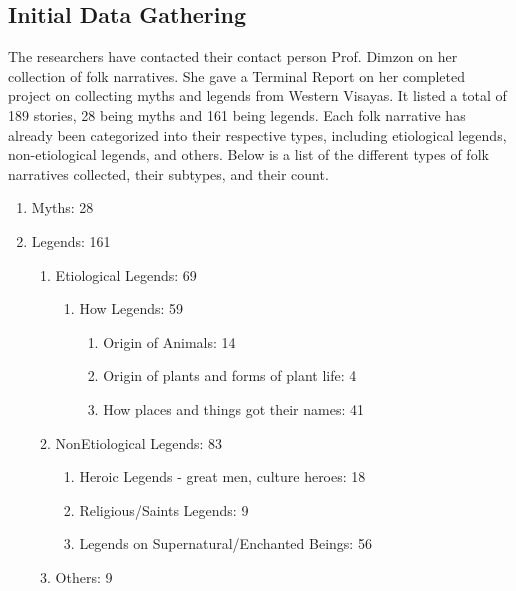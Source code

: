 \subsection{Initial Data Gathering}

The researchers have contacted their contact person Prof. Dimzon on her collection of folk narratives. She gave a Terminal Report  on her completed project on collecting myths and legends from Western Visayas. It listed a total of 189 stories, 28 being myths and 161 being legends. Each folk narrative has already been categorized into their respective types, including etiological legends, non-etiological legends, and others. Below is a list of the different types of folk narratives collected, their subtypes, and their count.

\begin{enumerate}[label=\Roman*.]
\item Myths: 28
    \item Legends: 161
    \begin{enumerate} [label=\Alph*.]
        \item Etiological Legends: 69
        \begin{enumerate}[label=\roman*.]
            \item How Legends: 59
            \begin{enumerate}[label=\alph*.]
                \item Origin of Animals: 14
                \item Origin of plants and forms of plant life: 4
                \item How places and things got their names: 41
            \end{enumerate}
        \end{enumerate}
        \item NonEtiological Legends: 83
            \begin{enumerate}[label=\roman*.]
                \item Heroic Legends - great men, culture heroes: 18
                \item Religious/Saints Legends: 9
                \item Legends on Supernatural/Enchanted Beings: 56
            \end{enumerate}
        \item Others: 9
    \end{enumerate}
\end{enumerate}




\FloatBarrier

